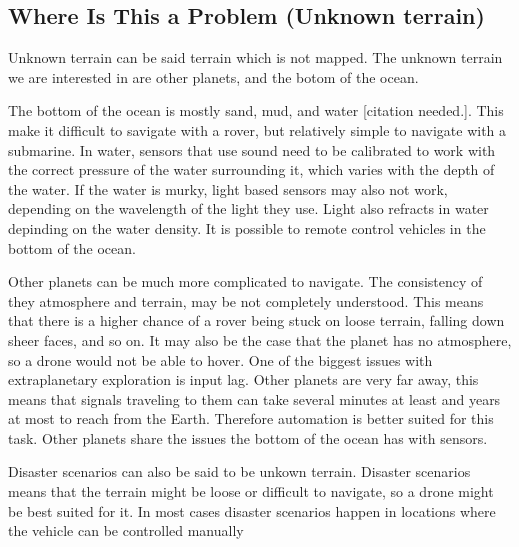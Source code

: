 \subsection{Where Is This a Problem (Unknown terrain)}

Unknown terrain can be said terrain which is not mapped. The unknown terrain we are interested in are other planets, and the botom of the ocean.
    
The bottom of the ocean is mostly sand, mud, and water [citation needed.]. This make it difficult to savigate with a rover, but relatively simple to navigate with a submarine. In water, sensors that use sound need to be calibrated to work with the correct pressure of the water surrounding it, which varies with the depth of the water. If the water is murky, light based sensors may also not work, depending on the wavelength of the light they use. Light also refracts in water depinding on the water density. It is possible to remote control vehicles in the bottom of the ocean.

Other planets can be much more complicated to navigate. The consistency of they atmosphere and terrain, may be not completely understood. This means that there is a higher chance of a rover being stuck on loose terrain, falling down sheer faces, and so on. It may also be the case that the planet has no atmosphere, so a drone would not be able to hover. One of the biggest issues with extraplanetary exploration is input lag. Other planets are very far away, this means that signals traveling to them can take several minutes at least and years at most to reach from the Earth. Therefore automation is better suited for this task. Other planets share the issues the bottom of the ocean has with sensors.

Disaster scenarios can also be said to be unkown terrain. Disaster scenarios means that the terrain might be loose or difficult to navigate, so a drone might be best suited for it. In most cases disaster scenarios happen in locations where the vehicle can be controlled manually
